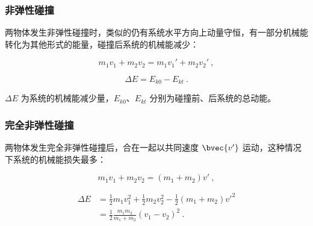 \subsubsection{非弹性碰撞}

两物体发生非弹性碰撞时，类似的仍有系统水平方向上动量守恒，有一部分机械能转化为其他形式的能量，碰撞后系统的机械能减少：

\begin{equation}
m_1v_1+m_2v_2=m_1v_1'+m_2v_2'~,
\end{equation}

\begin{equation}
\Delta E = E_{k0}-E_{kt}~.
\end{equation}

$\Delta E$ 为系统的机械能减少量，$E_{k0}$、$ E_{kt}$ 分别为碰撞前、后系统的总动能。

\subsubsection{完全非弹性碰撞}

两物体发生完全非弹性碰撞后，合在一起以共同速度 $\bvec {v'}$ 运动，这种情况下系统的机械能损失最多：

\begin{equation}
m_1v_1+m_2v_2=(m_1+m_2)v'~,
\end{equation}

\begin{equation}
\begin{aligned}
\Delta E&=\frac12m_1v_1^2+\frac12m_2v_2^2-\frac12(m_1+m_2)v'^2\\
&=\frac{1}{2}\frac{m_1m_2}{m_1+m_2}\left(v_1-v_2\right)^2~.\\
\end{aligned}
\end{equation}



